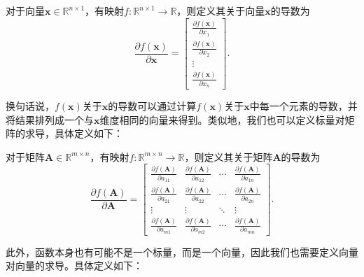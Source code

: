 \begin{definition}[标量关于向量求导]
    对于向量$\bm{x} \in \mathbb{R}^{n \times 1}$，有映射\( f: \mathbb{R}^{n \times 1} \rightarrow \mathbb{R} \)，则定义其关于向量\( \bm{x} \)的导数为
    \[
        \frac{\partial f(\bm{x})}{\partial \bm{x}}  =
        \begin{bmatrix}
            \frac{\partial f(\bm{x})}{\partial x_1} \\
            \frac{\partial f(\bm{x})}{\partial x_2} \\
            \vdots                                  \\
            \frac{\partial f(\bm{x})}{\partial x_n}
        \end{bmatrix}.
    \]
\end{definition}

换句话说，\( f(\bm{x}) \)关于\( \bm{x} \)的导数可以通过计算\( f(\bm{x}) \)关于\( \bm{x} \)中每一个元素的导数，并将结果排列成一个与\( \bm{x} \)维度相同的向量来得到。类似地，我们也可以定义标量对矩阵的求导，具体定义如下：

\begin{definition}[标量关于矩阵求导]
    对于矩阵$\mathbf{A} \in \mathbb{R}^{m \times n}$，有映射\( f: \mathbb{R}^{m \times n} \rightarrow \mathbb{R} \)，则定义其关于矩阵\( \mathbf{A} \)的导数为
    \[
        \frac{\partial f(\mathbf{A})}{\partial \mathbf{A}} =
        \begin{bmatrix}
            \frac{\partial f(\mathbf{A})}{\partial a_{11}} & \frac{\partial f(\mathbf{A})}{\partial a_{12}} & \cdots & \frac{\partial f(\mathbf{A})}{\partial a_{1n}} \\
            \frac{\partial f(\mathbf{A})}{\partial a_{21}} & \frac{\partial f(\mathbf{A})}{\partial a_{22}} & \cdots & \frac{\partial f(\mathbf{A})}{\partial a_{2n}} \\
            \vdots                                         & \vdots                                         & \ddots & \vdots                                         \\
            \frac{\partial f(\mathbf{A})}{\partial a_{m1}} & \frac{\partial f(\mathbf{A})}{\partial a_{m2}} & \cdots & \frac{\partial f(\mathbf{A})}{\partial a_{mn}}
        \end{bmatrix}.
    \]
\end{definition}

此外，函数本身也有可能不是一个标量，而是一个向量，因此我们也需要定义向量对向量的求导。具体定义如下：

